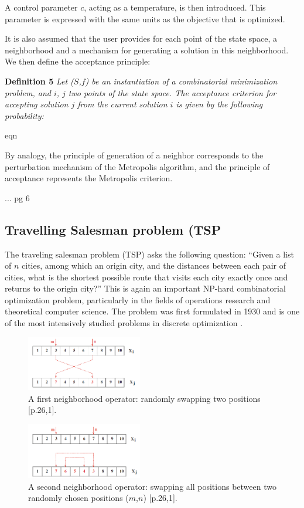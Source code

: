 \documentclass[conference]{IEEEtran}
\begin{document}
A control parameter $c$, acting as a temperature, is then introduced. This parameter is expressed with the same units as the objective that is optimized.

It is also assumed that the user provides for each point of the state space, a neighborhood and a mechanism for generating a solution in this neighborhood. We then define the acceptance principle:

\textbf{Definition 5} \textit{Let ($S$,$f$) be an instantiation of a combinatorial minimization problem, and $i$, $j$ two points of the state space. The acceptance criterion for accepting solution $j$ from the current solution $i$ is given by the following probability:}

eqn

By analogy, the principle of generation of a neighbor corresponds to the perturbation mechanism of the Metropolis algorithm, and the principle of acceptance represents the Metropolis criterion.

...
pg 6

\subsection{Travelling Salesman problem (TSP}
The traveling salesman problem (TSP) asks the following question: “Given a list of $n$ cities, among which an origin city, and the distances between each pair of cities, what is the shortest possible route that visits each city exactly once and returns to
the origin city?” This is again an important NP-hard combinatorial optimization problem, particularly in the fields of operations research and theoretical computer science. The problem was first formulated in 1930 and is one of the most intensively studied problems in discrete optimization \cite{b7}.

\begin{figure}[H]
\centerline{\includegraphics[width=0.45\textwidth,height=0.45\textheight,keepaspectratio]{fig3.png}}
\caption{A first neighborhood operator: randomly swapping two positions [p.26,1].}
\end{figure}

\begin{figure}[H]
\centerline{\includegraphics[width=0.45\textwidth,height=0.45\textheight,keepaspectratio]{fig4.png}}
\caption{A second neighborhood operator: swapping all positions between two randomly chosen positions ($m$,$n$) [p.26,1].}
\end{figure}
\end{document}
